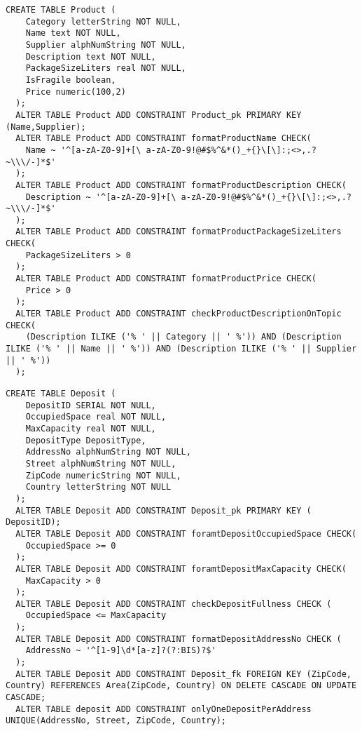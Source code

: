 \begin{lstlisting}[caption={Creazione della tabella \textbf{Product}}]
  CREATE TABLE Product (
    Category letterString NOT NULL,
    Name text NOT NULL,
    Supplier alphNumString NOT NULL,
    Description text NOT NULL,
    PackageSizeLiters real NOT NULL,
    IsFragile boolean,
    Price numeric(100,2)
  );
  ALTER TABLE Product ADD CONSTRAINT Product_pk PRIMARY KEY (Name,Supplier);
  ALTER TABLE Product ADD CONSTRAINT formatProductName CHECK(
    Name ~ '^[a-zA-Z0-9]+[\ a-zA-Z0-9!@#$%^&*()_+{}\[\]:;<>,.?~\\\/-]*$'
  );
  ALTER TABLE Product ADD CONSTRAINT formatProductDescription CHECK(
    Description ~ '^[a-zA-Z0-9]+[\ a-zA-Z0-9!@#$%^&*()_+{}\[\]:;<>,.?~\\\/-]*$'
  );
  ALTER TABLE Product ADD CONSTRAINT formatProductPackageSizeLiters CHECK(
    PackageSizeLiters > 0
  );
  ALTER TABLE Product ADD CONSTRAINT formatProductPrice CHECK(
    Price > 0
  );
  ALTER TABLE Product ADD CONSTRAINT checkProductDescriptionOnTopic CHECK(
    (Description ILIKE ('% ' || Category || ' %')) AND (Description ILIKE ('% ' || Name || ' %')) AND (Description ILIKE ('% ' || Supplier || ' %'))
  );
\end{lstlisting}


\begin{lstlisting}[caption={Creazione della tabella \textbf{Deposit}}]
  CREATE TABLE Deposit (
    DepositID SERIAL NOT NULL,
    OccupiedSpace real NOT NULL,
    MaxCapacity real NOT NULL,
    DepositType DepositType,
    AddressNo alphNumString NOT NULL,
    Street alphNumString NOT NULL,
    ZipCode numericString NOT NULL,
    Country letterString NOT NULL
  );
  ALTER TABLE Deposit ADD CONSTRAINT Deposit_pk PRIMARY KEY ( DepositID);
  ALTER TABLE Deposit ADD CONSTRAINT foramtDepositOccupiedSpace CHECK(
    OccupiedSpace >= 0
  );
  ALTER TABLE Deposit ADD CONSTRAINT foramtDepositMaxCapacity CHECK(
    MaxCapacity > 0
  );
  ALTER TABLE Deposit ADD CONSTRAINT checkDepositFullness CHECK (
    OccupiedSpace <= MaxCapacity
  );
  ALTER TABLE Deposit ADD CONSTRAINT formatDepositAddressNo CHECK (
    AddressNo ~ '^[1-9]\d*[a-z]?(?:BIS)?$'
  );
  ALTER TABLE Deposit ADD CONSTRAINT Deposit_fk FOREIGN KEY (ZipCode, Country) REFERENCES Area(ZipCode, Country) ON DELETE CASCADE ON UPDATE CASCADE;
  ALTER TABLE deposit ADD CONSTRAINT onlyOneDepositPerAddress UNIQUE(AddressNo, Street, ZipCode, Country);
\end{lstlisting}

